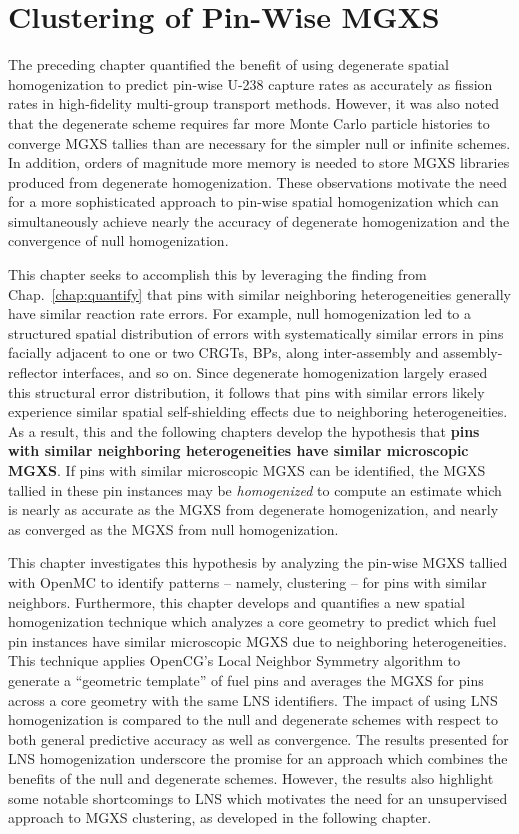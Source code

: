 \chapter{Clustering of Pin-Wise MGXS}
\label{chap:spatial}

The preceding chapter quantified the benefit of using degenerate spatial homogenization to predict pin-wise U-238 capture rates as accurately as fission rates in high-fidelity multi-group transport methods. However, it was also noted that the degenerate scheme requires far more Monte Carlo particle histories to converge \ac{MGXS} tallies than are necessary for the simpler null or infinite schemes. In addition, orders of magnitude more memory is needed to store \ac{MGXS} libraries produced from degenerate homogenization. These observations motivate the need for a more sophisticated approach to pin-wise spatial homogenization which can simultaneously achieve nearly the accuracy of degenerate homogenization and the convergence of null homogenization.

This chapter seeks to accomplish this by leveraging the finding from Chap.~\ref{chap:quantify} that pins with similar neighboring heterogeneities generally have similar reaction rate errors. For example, null homogenization led to a structured spatial distribution of errors with systematically similar errors in pins facially adjacent to one or two \acp{CRGT}, \acp{BP}, along inter-assembly and assembly-reflector interfaces, and so on. Since degenerate homogenization largely erased this structural error distribution, it follows that pins with similar errors likely experience similar spatial self-shielding effects due to neighboring heterogeneities. As a result, this and the following chapters develop the hypothesis that \textbf{pins with similar neighboring heterogeneities have similar microscopic \ac{MGXS}}. If pins with similar microscopic \ac{MGXS} can be identified, the \ac{MGXS} tallied in these pin instances may be \textit{homogenized} to compute an estimate which is nearly as accurate as the \ac{MGXS} from degenerate homogenization, and nearly as converged as the \ac{MGXS} from null homogenization. 

This chapter investigates this hypothesis by analyzing the pin-wise \ac{MGXS} tallied with OpenMC to identify patterns -- namely, clustering -- for pins with similar neighbors. Furthermore, this chapter develops and quantifies a new spatial homogenization technique which analyzes a core geometry to predict which fuel pin instances have similar microscopic \ac{MGXS} due to neighboring heterogeneities. This technique applies OpenCG's Local Neighbor Symmetry algorithm to generate a ``geometric template'' of fuel pins and averages the \ac{MGXS} for pins across a core geometry with the same \ac{LNS} identifiers. The impact of using \ac{LNS} homogenization is compared to the null and degenerate schemes with respect to both general predictive accuracy as well as convergence. The results presented for \ac{LNS} homogenization underscore the promise for an approach which combines the benefits of the null and degenerate schemes. However, the results also highlight some notable shortcomings to \ac{LNS} which motivates the need for an unsupervised approach to \ac{MGXS} clustering, as developed in the following chapter.

